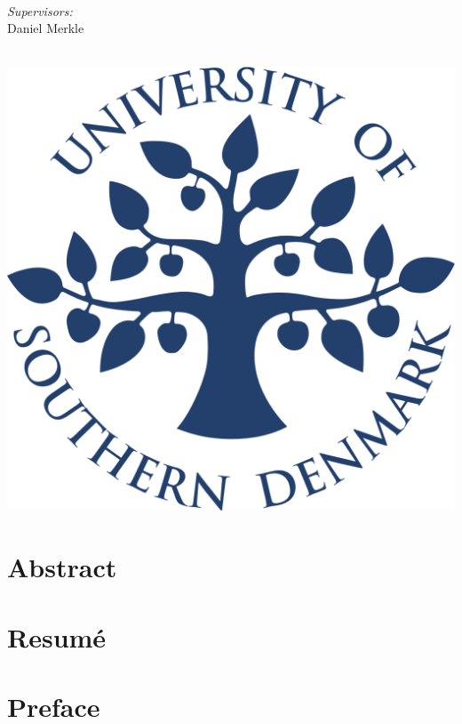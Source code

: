 \documentclass[a4paper,10pt,titlepage]{paper}
\begin{document}
\begin{titlepage}
\begin{minipage}{0.3\textwidth}
\begin{flushleft}
\end{flushleft}
\end{minipage}
~
\begin{minipage}{0.4\textwidth}
\begin{flushright} \large
\vspace{0.5cm}
\emph{Supervisors:} \\
Daniel Merkle
\end{flushright}
\end{minipage}\\[4cm]
\includegraphics[scale=0.3]{Billeder/logo.png}
\vfill %

\end{titlepage}

\tableofcontents
\newpage

\vfill
\section*{Abstract}

\section*{Resumé}
\newpage

\section{Preface}
\end{document}
